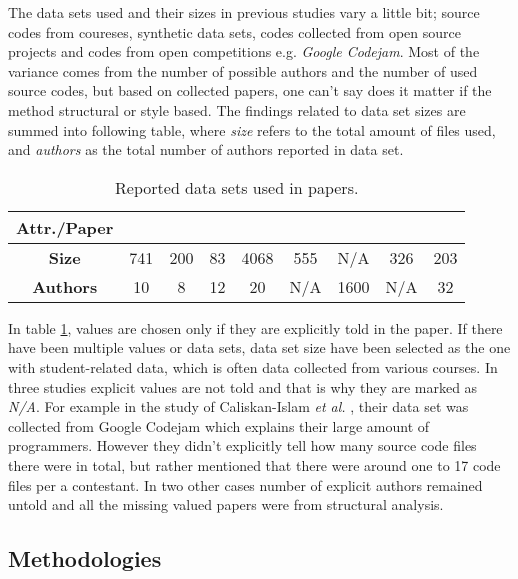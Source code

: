 \documentclass[english]{tktltiki2}
\theoremstyle{definition}
\theoremstyle{remark}
\begin{document}
The data sets used and their sizes in previous studies vary a little bit; source codes from coureses, synthetic data sets, codes collected from open source projects and codes from open competitions e.g. \textit{Google Codejam}.  Most of the variance comes from the number of possible authors and the number of used source codes, but based on collected papers, one can't say does it matter if the method structural or style based. The findings related to data set sizes are summed into following table, where \textit{size} refers to the total amount of files used, and \textit{authors} as the total number of authors reported in data set. 

\begin{table}[ht]
\centering
\begin{tabular}{c|cccccccc}
\textbf{Attr./Paper} & \cite{bandara2011machine}   & \cite{kothari2007probabilistic}   & \cite{Elenbogen:2008:DOS:1295109.1295123}  & \cite{lange2007using}    & \cite{Son:2013:APS:2508269.2508323}   & \cite{caliskan2015anonymizing}    & \cite{jadalla2008pde4java}   & \cite{rosenblum2011wrote}   \\ \hline
\textbf{Size}        & 741 & 200 & 83 & 4068 & 555 & N/A  & 326 & 203 \\
\textbf{Authors}     & 10  & 8   & 12 & 20   & N/A & 1600 & N/A & 32 
\end{tabular}
\caption{Reported data sets used in papers.}
\label{table:data}
\end{table}

\noindent
In table \ref{table:data}, values are chosen only if they are explicitly told in the paper. If there have been multiple values or data sets, data set size have been selected as the one with student-related data, which is often data collected from various courses. In three studies explicit values are not told and that is why they are marked as \textit{N/A}. For example in the study of Caliskan-Islam \textit{et al.} \cite{caliskan2015anonymizing}, their data set was collected from Google Codejam which explains their large amount of programmers. However they didn't explicitly tell how many source code files there were in total, but rather mentioned that there were around one to 17 code files per a contestant. In two other cases number of explicit authors remained untold and all the missing valued papers were from structural analysis. 

\subsection{Methodologies}
\end{document}
